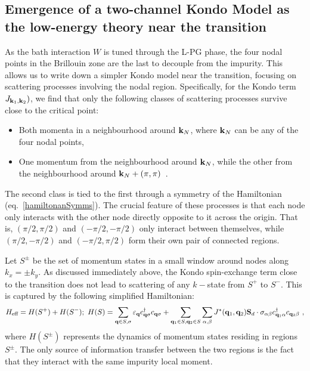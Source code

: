 \documentclass[reprint,hidelinks,onecolumn]{revtex4-2}
\begin{document}
\subsection{Emergence of a two-channel Kondo Model as the low-energy theory near the transition}
As the bath interaction \(W\) is tuned through the L-PG phase, the four nodal points in the Brillouin zone are the last to decouple from the impurity. This allows us to write down a simpler Kondo model near the transition, focusing on scattering processes involving the nodal region. Specifically, for the Kondo term \(J_{{\bf k}_1, {\bf k}_2})\), we find that only the following classes of scattering processes survive close to the critical point:
\begin{itemize}
	\item Both momenta in a neighbourhood around \({\bf k}_N\), where \({\bf k}_N\) can be any of the four nodal points,
	\item One momentum from the neighbourhood around \({\bf k}_N\), while the other from the neighbourhood around \({\bf k}_N + \left( \pi, \pi \right) \)~.
\end{itemize}
The second class is tied to the first through a symmetry of the Hamiltonian (eq.~\ref{hamiltonanSymms}). The crucial feature of these processes is that each node only interacts with the other node directly opposite to it across the origin. That is, \(\left(\pi/2, \pi/2\right) \) and \(\left(-\pi/2, -\pi/2\right) \) only interact between themselves, while \(\left(\pi/2, -\pi/2\right) \) and \(\left(-\pi/2, \pi/2\right) \) form their own pair of connected regions. 

Let \(S^\pm\) be the set of momentum states in a small window around nodes along \(k_x = \pm k_y\). As discussed immediately above, the Kondo spin-exchange term close to the transition does not lead to scattering of any \(k-\)state from \(S^+\) to \(S^-\). This is captured by the following simplified Hamiltonian:
\begin{equation}\begin{aligned}\label{twoChannel}
H_\text{eff} = H(S^+) + H(S^-);~H(S) = \sum_{{\bf q}\in S,\sigma}\varepsilon_{\bf q}c^\dagger_{{\bf q}\sigma}c_{{\bf q}\sigma} + \sum_{{\bf q}_1\in S,{\bf q}_2\in S}\sum_{\alpha,\beta}J^*({\bf q}_1,{\bf q}_2){\bf S}_d\cdot {\bf \sigma}_{\alpha\beta}c^\dagger_{{\bf q}_1\alpha}c_{{\bf q}_2\beta}~,
\end{aligned}\end{equation}
where \(H(S^\pm)\) represents the dynamics of momentum states residing in regions \(S^\pm\). The only source of information transfer between the two regions is the fact that they interact with the same impurity local moment.
\end{document}
